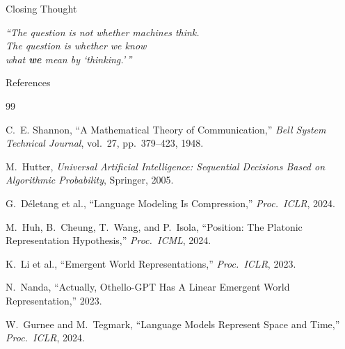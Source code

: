 \documentclass[aspectratio=169, 12pt]{beamer}
\begin{document}
\begin{frame}{Closing Thought}

\vspace{2em}
\begin{center}
\Large
\emph{``The question is not whether machines think.}\\[0.5em]
\emph{The question is whether we know\\
what \textbf{we} mean by `thinking.'\,''}
\end{center}

\end{frame}

\begin{frame}[allowframebreaks]{References}
\scriptsize\raggedright
\begin{thebibliography}{99}

C.~E. Shannon,
``A Mathematical Theory of Communication,''
\emph{Bell System Technical Journal}, vol.~27, pp.~379--423, 1948.

M.~Hutter,
\emph{Universal Artificial Intelligence: Sequential Decisions Based on
Algorithmic Probability},
Springer, 2005.

G.~D\'{e}letang et al.,
``Language Modeling Is Compression,''
\emph{Proc.\ ICLR}, 2024.

M.~Huh, B.~Cheung, T.~Wang, and P.~Isola,
``Position: The Platonic Representation Hypothesis,''
\emph{Proc.\ ICML}, 2024.

K.~Li et al.,
``Emergent World Representations,''
\emph{Proc.\ ICLR}, 2023.

N.~Nanda,
``Actually, Othello-GPT Has A Linear Emergent World Representation,''
2023.

W.~Gurnee and M.~Tegmark,
``Language Models Represent Space and Time,''
\emph{Proc.\ ICLR}, 2024.

\end{thebibliography}
\end{frame}
\end{document}
